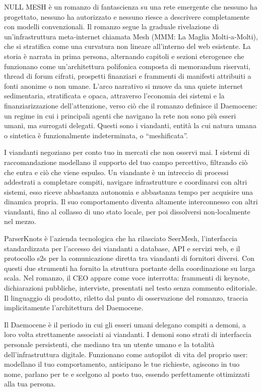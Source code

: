 \begingroup
\fontsize{9pt}{11.5pt}\selectfont
NULL MESH è un romanzo di fantascienza su una rete emergente che nessuno ha progettato, nessuno ha autorizzato e nessuno riesce a descrivere completamente con modelli convenzionali. Il romanzo segue la graduale rivelazione di un’infrastruttura meta‑internet chiamata Mesh (MMM: La Maglia Molti‑a‑Molti), che si stratifica come una curvatura non lineare all’interno del web esistente.
La storia è narrata in prima persona, alternando capitoli e sezioni eterogenee che funzionano come un’architettura polifonica composta di memorandum riservati, thread di forum cifrati, prospetti finanziari e frammenti di manifesti attribuiti a fonti anonime o non umane. L’arco narrativo si muove da una quiete internet sedimentaria, stratificata e opaca, attraverso l’economia dei sistemi e la finanziarizzazione dell’attenzione, verso ciò che il romanzo definisce il Daemocene: un regime in cui i principali agenti che navigano la rete non sono più esseri umani, ma surrogati delegati. Questi sono i viandanti, entità la cui natura umana o sintetica è funzionalmente indeterminata, o “meshificata”.

I viandanti negoziano per conto tuo in mercati che non osservi mai. I sistemi di raccomandazione modellano il supporto del tuo campo percettivo, filtrando ciò che entra e ciò che viene espulso. Un viandante è un intreccio di processi addestrati a completare compiti, navigare infrastrutture e coordinarsi con altri sistemi, esso riceve abbastanza autonomia e abbastanza tempo per acquisire una dinamica propria. Il suo comportamento diventa altamente interconnesso con altri viandanti, fino al collasso di uno stato locale, per poi dissolversi non‑localmente nel mezzo.

ParserKnots è l’azienda tecnologica che ha rilasciato SeerMesh, l’interfaccia standardizzata per l’accesso dei viandanti a database, API e servizi web, e il protocollo s2s per la comunicazione diretta tra viandanti di fornitori diversi. Con questi due strumenti ha fornito la struttura portante della coordinazione su larga scala. Nel romanzo, il CEO appare come voce interrotta: frammenti di keynote, dichiarazioni pubbliche, interviste, presentati nel testo senza commento editoriale. Il linguaggio di prodotto, riletto dal punto di osservazione del romanzo, traccia implicitamente l’architettura del Daemocene.

Il Daemocene è il periodo in cui gli esseri umani delegano compiti a demoni, a loro volta strettamente associati ai viandanti. I demoni sono strati di interfaccia personale persistenti, che mediano tra un utente umano e la totalità dell’infrastruttura digitale. Funzionano come autopilot di vita del proprio user: modellano il tuo comportamento, anticipano le tue richieste, agiscono in tuo nome, parlano per te e scelgono al posto tuo, essendo perfettamente ottimizzati alla tua persona.

